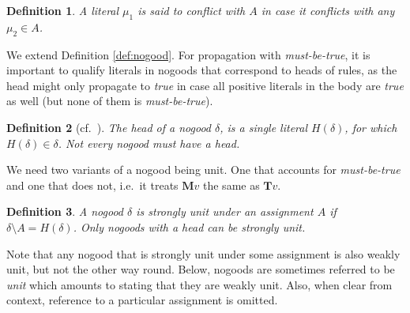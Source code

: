 \documentclass{vutinfth} %
\newcommand{\todo}[1]{{\color{red}\textbf{TODO: {#1}}}} %
\newtheorem{definition}{Definition}[chapter]
\newcommand{\mbt}{must-be-true\xspace}
\newcommand{\ass}{A}
\newcommand{\bT}{\mathbf{T}}
\newcommand{\bM}{\mathbf{M}}
\newcommand{\bF}{\mathbf{F}}
\newcommand{\bX}{\mathbf{X}}
\newcommand{\headf}{H}
\newcommand{\bodyf}{B}
\newcommand{\sgl}{\mu}
\begin{document}


\begin{definition}
A literal $\sgl_1$ is said to conflict with $\ass$ in case it conflicts with any $\sgl_2 \in \ass$.
\end{definition}

We extend Definition \ref{def:nogood}. For propagation with \emph{\mbt}, it is important to qualify literals in nogoods that correspond to heads of rules, as the head might only propagate to \emph{true} in case all positive literals in the body are \emph{true} as well (but none of them is \emph{\mbt}). %

\begin{definition}[{cf.~\cite{alpha-techniques}}]
The \emph{head} of a nogood $\delta$, is a single literal $\headf(\delta)$, for which $\headf(\delta) \in \delta$. Not every nogood must have a head.%
\end{definition}



We need two variants of a nogood being unit. One that accounts for \emph{\mbt} and one that does not, i.e.~it treats $\bM v$ the same as $\bT v$.

\begin{definition}
A nogood $\delta$ is \emph{strongly unit} under an assignment $\ass$ if $\delta \setminus \ass = \headf(\delta)$. Only nogoods with a head can be strongly unit.
\end{definition}

Note that any nogood that is strongly unit under some assignment is also weakly unit, but not the other way round. Below, nogoods are sometimes referred to be \emph{unit} which amounts to stating that they are weakly unit. Also, when clear from context, reference to a particular assignment is omitted.
\end{document}
